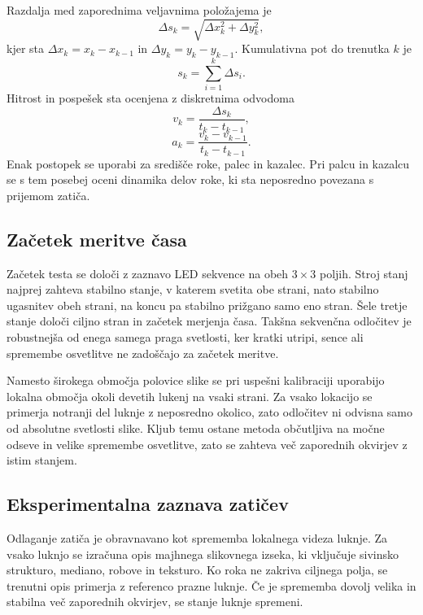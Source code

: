 \documentclass[journal,a4paper,twoside]{sty/IEEEtran}
\begin{document}
Razdalja med zaporednima veljavnima položajema je
\begin{equation}
    \Delta s_k = \sqrt{\Delta x_k^2+\Delta y_k^2},
\label{eq:step}
\end{equation}
kjer sta $\Delta x_k=x_k-x_{k-1}$ in $\Delta y_k=y_k-y_{k-1}$.
Kumulativna pot do trenutka $k$ je
\begin{equation}
    s_k=\sum_{i=1}^{k} \Delta s_i.
    \label{eq:path}
\end{equation}
Hitrost in pospešek sta ocenjena z diskretnima odvodoma
\begin{equation}
    v_k=\frac{\Delta s_k}{t_k-t_{k-1}},
    \label{eq:speed}
\end{equation}
\begin{equation}
    a_k=\frac{v_k-v_{k-1}}{t_k-t_{k-1}}.
    \label{eq:acceleration}
\end{equation}
Enak postopek se uporabi za središče roke, palec in kazalec. Pri palcu in kazalcu se s tem posebej oceni dinamika delov roke, ki sta neposredno povezana s prijemom zatiča.

\subsection{Začetek meritve časa}

Začetek testa se določi z zaznavo LED sekvence na obeh $3 \times 3$ poljih. Stroj stanj najprej zahteva stabilno stanje, v katerem svetita obe strani, nato stabilno ugasnitev obeh strani, na koncu pa stabilno prižgano samo eno stran. Šele tretje stanje določi ciljno stran in začetek merjenja časa. Takšna sekvenčna odločitev je robustnejša od enega samega praga svetlosti, ker kratki utripi, sence ali spremembe osvetlitve ne zadoščajo za začetek meritve.

Namesto širokega območja polovice slike se pri uspešni kalibraciji uporabijo lokalna območja okoli devetih lukenj na vsaki strani. Za vsako lokacijo se primerja notranji del luknje z neposredno okolico, zato odločitev ni odvisna samo od absolutne svetlosti slike. Kljub temu ostane metoda občutljiva na močne odseve in velike spremembe osvetlitve, zato se zahteva več zaporednih okvirjev z istim stanjem.

\subsection{Eksperimentalna zaznava zatičev}

Odlaganje zatiča je obravnavano kot sprememba lokalnega videza luknje. Za vsako luknjo se izračuna opis majhnega slikovnega izseka, ki vključuje sivinsko strukturo, mediano, robove in teksturo. Ko roka ne zakriva ciljnega polja, se trenutni opis primerja z referenco prazne luknje. Če je sprememba dovolj velika in stabilna več zaporednih okvirjev, se stanje luknje spremeni.
\end{document}
